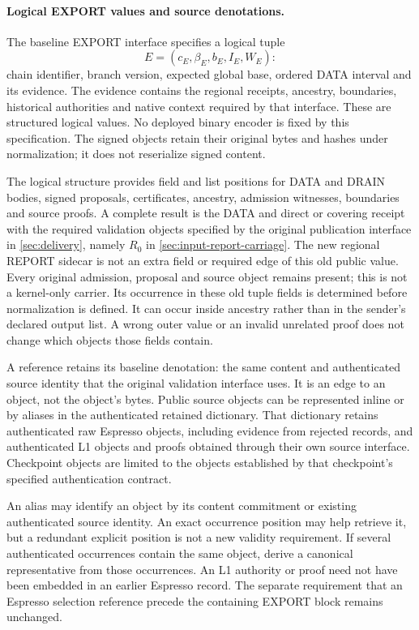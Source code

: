 \paragraph{Logical EXPORT values and source denotations.}
\label{sec:logical-carrier}
The baseline EXPORT interface specifies a logical tuple
\[
 E=(c_E,\beta_E,b_E,I_E,W_E):
\]
chain identifier, branch version, expected global base, ordered DATA
interval and its evidence. The evidence contains the regional
receipts, ancestry, boundaries, historical authorities and native
context required by that interface. These are structured logical
values. No deployed binary encoder is fixed by this specification.
The signed objects retain their original bytes and hashes under
normalization; it does not reserialize signed content.

The logical structure provides field and list positions for DATA and
DRAIN bodies, signed proposals, certificates, ancestry, admission
witnesses, boundaries and source proofs. A complete result is the
DATA and direct or covering receipt with the required validation
objects specified by the original publication interface in
\cref{sec:delivery}, namely $R_0$ in \cref{sec:input-report-carriage}.
The new regional REPORT sidecar is not an extra field or required edge
of this old public value. Every original admission, proposal and source
object remains present; this is not a kernel-only carrier. Its occurrence
in these old tuple fields is determined before normalization is
defined. It can occur inside ancestry rather than in the sender's
declared output list. A wrong outer value or an invalid unrelated
proof does not change which objects those fields contain.

A reference retains its baseline denotation: the same content and
authenticated source identity that the original validation interface
uses. It is an edge to an object, not the object's bytes. Public source
objects can be represented inline or by aliases in the authenticated
retained dictionary. That dictionary retains authenticated raw
Espresso objects, including evidence from rejected records, and
authenticated L1 objects and proofs obtained through their own source
interface. Checkpoint objects are limited to the objects established
by that checkpoint's specified authentication contract.

An alias may identify an object by its content commitment or existing
authenticated source identity. An exact occurrence position may help
retrieve it, but a redundant explicit position is not a new validity
requirement. If several authenticated occurrences contain the same
object, derive a canonical representative from those occurrences.
An L1 authority or proof need not have been embedded in an earlier
Espresso record. The separate requirement that an Espresso selection
reference precede the containing EXPORT block remains unchanged.

